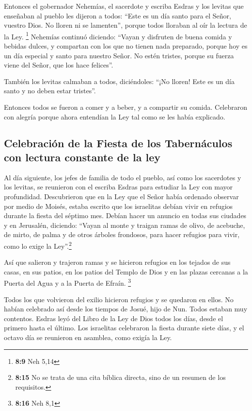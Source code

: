 Entonces el gobernador Nehemías, el sacerdote y escriba
Esdras y los levitas que enseñaban al pueblo les dijeron a todos: ``Este
es un día santo para el Señor, vuestro Dios. No lloren ni se lamenten'',
porque todos lloraban al oír la lectura de la Ley. \footnote{\textbf{8:9}
  Neh 5,14}  Nehemías continuó diciendo: ``Vayan y
disfruten de buena comida y bebidas dulces, y compartan con los que no
tienen nada preparado, porque hoy es un día especial y santo para
nuestro Señor. No estén tristes, porque su fuerza viene del Señor, que
los hace felices''.

 También los levitas calmaban a todos, diciéndoles: ``¡No
lloren! Este es un día santo y no deben estar tristes''.

 Entonces todos se fueron a comer y a beber, y a
compartir su comida. Celebraron con alegría porque ahora entendían la
Ley tal como se les había explicado.

\hypertarget{celebraciuxf3n-de-la-fiesta-de-los-tabernuxe1culos-con-lectura-constante-de-la-ley}{%
\subsection{Celebración de la Fiesta de los Tabernáculos con lectura
constante de la
ley}\label{celebraciuxf3n-de-la-fiesta-de-los-tabernuxe1culos-con-lectura-constante-de-la-ley}}

 Al día siguiente, los jefes de familia de todo el
pueblo, así como los sacerdotes y los levitas, se reunieron con el
escriba Esdras para estudiar la Ley con mayor profundidad.
 Descubrieron que en la Ley que el Señor había ordenado
observar por medio de Moisés, estaba escrito que los israelitas debían
vivir en refugios durante la fiesta del séptimo mes. 
Debían hacer un anuncio en todas sus ciudades y en Jerusalén, diciendo:
``Vayan al monte y traigan ramas de olivo, de acebuche, de mirto, de
palma y de otros árboles frondosos, para hacer refugios para vivir, como
lo exige la Ley''.\footnote{\textbf{8:15} No se trata de una cita
  bíblica directa, sino de un resumen de los requisitos.}

 Así que salieron y trajeron ramas y se hicieron refugios
en los tejados de sus casas, en sus patios, en los patios del Templo de
Dios y en las plazas cercanas a la Puerta del Agua y a la Puerta de
Efraín. \footnote{\textbf{8:16} Neh 8,1}

 Todos los que volvieron del exilio hicieron refugios y
se quedaron en ellos. No habían celebrado así desde los tiempos de
Josué, hijo de Nun. Todos estaban muy contentos.  Esdras
leyó del Libro de la Ley de Dios todos los días, desde el primero hasta
el último. Los israelitas celebraron la fiesta durante siete días, y el
octavo día se reunieron en asamblea, como exigía la Ley.

